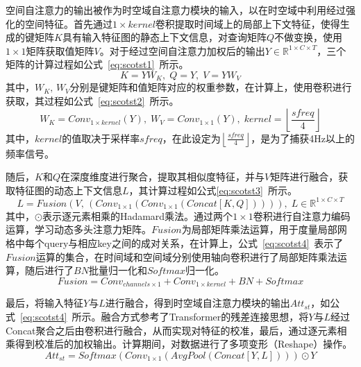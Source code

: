 空间自注意力的输出被作为时空域自注意力模块的输入，以在时空域中利用经过强化的空间特征。首先通过\(1 \times kernel\)卷积提取时间域上的局部上下文特征，使得生成的键矩阵\(K\)具有输入特征图的静态上下文信息，对查询矩阵\(Q\)不做变换，使用\(1\times1\)矩阵获取值矩阵\(V\)。对于经过空间自注意力加权后的输出\(Y  \in \mathbb{R}^{1 \times C \times T}\)，三个矩阵的计算过程如公式~\ref{eq:scotst1}~所示。
\begin{equation}\label{eq:scotst1}
    K=YW_K,\;Q=Y,\;V=YW_V
\end{equation}
其中，\(W_K,\,W_V\)分别是键矩阵和值矩阵对应的权重参数，在计算上，使用卷积进行获取，其过程如公式~\ref{eq:scotst2}~所示。
\begin{equation}\label{eq:scotst2}
    W_K=Conv_{1 \times kernel}(Y),\;W_V=Conv_{1 \times 1}(Y),\;kernel=\left \lfloor \frac{sfreq}{4} \right \rfloor 
\end{equation}
其中，\(kernel\)的值取决于采样率\(sfreq\)，在此设定为\(\left \lfloor \frac{sfreq}{4} \right \rfloor\)，是为了捕获4Hz以上的频率信号。

随后，\(K\)和\(Q\)在深度维度进行聚合，提取其相似度特征，并与\(V\)矩阵进行融合，获取特征图的动态上下文信息\(L\)，其计算过程如公式\ref{eq:scotst3}~所示。
\begin{equation}\label{eq:scotst3}
    L=Fusion(V ,\, (Conv_{1 \times 1}(Conv_{1 \times 1}(Concat[K,Q])))),\;L \in \mathbb{R}^{1 \times C \times T}
\end{equation}
其中，\(\odot\)表示逐元素相乘的Hadamard乘法。通过两个\(1 \times 1\)卷积进行自注意力编码运算，学习动态多头注意力矩阵。\(Fusion\)为局部矩阵乘法运算，用于度量局部网格中每个query与相应key之间的成对关系，在计算上，公式~\ref{eq:scotst4}~表示了\(Fusion\)运算的集合，在时间域和空间域分别使用轴向卷积进行了局部矩阵乘法运算，随后进行了\(BN\)批量归一化和\(Softmax\)归一化。
\begin{equation}\label{eq:scotst4}
    Fusion=Conv_{channels \times 1}+Conv_{1 \times kernel} + BN + Softmax
\end{equation}

最后，将输入特征\(Y\)与\(L\)进行融合，得到时空域自注意力模块的输出\(Att_{st}\)，如公式~\ref{eq:scotst4}~所示。融合方式参考了Transformer的残差连接思想，将\(Y\)与\(L\)经过Concat聚合之后由卷积进行融合，从而实现对特征的校准，最后，通过逐元素相乘得到校准后的加权输出。计算期间，对数据进行了多项变形（Reshape）操作。
\begin{equation}\label{eq:scotst5}
    Att_{st}=Softmax(Conv_{1 \times 1}(AvgPool(Concat[Y,L]))) \odot Y
\end{equation}

